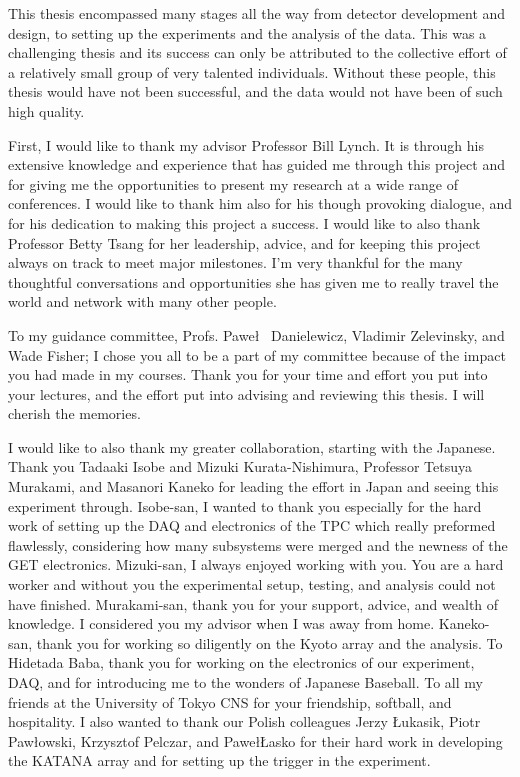 \documentclass{altmsuphddissertation}
\begin{document}
\begin{acknowledgment}
This thesis encompassed many stages all the way from detector development and design, to setting up the experiments and the analysis of the data. This was a challenging thesis and its success can only be attributed to the collective effort of a relatively small group of very talented individuals. Without these people, this thesis would have not been successful, and the data would not have been of such high quality. 

First, I would like to thank my advisor Professor Bill Lynch. It is through his extensive knowledge and experience that has guided me through this project and for giving me the opportunities to present my research at a wide range of conferences. I would like to thank him also for his though provoking dialogue, and for his dedication to making this project a success. I would like to also thank Professor Betty Tsang for her leadership, advice, and for keeping this project always on track to meet major milestones. I'm very thankful for the many thoughtful conversations and opportunities she has given me to really travel the world and network with many other people.  

To my guidance committee, Profs. Pawe\l~ Danielewicz, Vladimir Zelevinsky, and Wade Fisher; I chose you all to be a part of my committee because of the impact you had made in my courses. Thank you for your time and effort you put into your lectures, and the effort put into advising and reviewing this thesis. I will cherish the memories.

I would like to also thank my greater collaboration, starting with the Japanese. Thank you Tadaaki Isobe and Mizuki Kurata-Nishimura, Professor Tetsuya Murakami, and Masanori Kaneko for leading the effort in Japan and seeing this experiment through. Isobe-san, I wanted to thank you especially for the hard work of setting up the DAQ and electronics of the TPC which really preformed flawlessly, considering how many subsystems were merged and the newness of the GET electronics. Mizuki-san, I always enjoyed working with you. You are a hard worker and without you the experimental setup, testing, and analysis could not have finished. Murakami-san, thank you for your support, advice, and wealth of knowledge. I considered you my advisor when I was away from home. Kaneko-san, thank you for working so diligently on the Kyoto array and the analysis. To Hidetada Baba, thank you for working on the electronics of our experiment, DAQ, and for introducing me to the wonders of Japanese Baseball. To all my friends at the University of Tokyo CNS for your friendship, softball, and hospitality. I also wanted to thank our Polish colleagues Jerzy \L ukasik, Piotr Paw\l owski, Krzysztof Pelczar, and Pawe\l \L asko for their hard work in developing the KATANA array and for setting up the trigger in the experiment. 


\end{acknowledgment}
\end{document}
